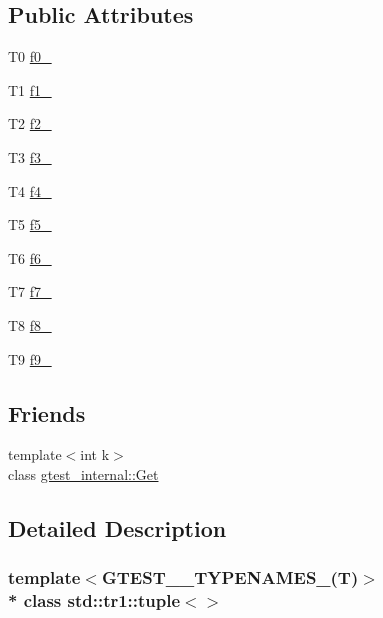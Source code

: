 \subsection*{Public Attributes}
\begin{DoxyCompactItemize}
\item 
T0 \hyperlink{classstd_1_1tr1_1_1tuple_a771b1d99e8800fb284acd04bca838cbb}{f0\+\_\+}
\item 
T1 \hyperlink{classstd_1_1tr1_1_1tuple_a7cccf899dedc626c51fa4f6921d0ac52}{f1\+\_\+}
\item 
T2 \hyperlink{classstd_1_1tr1_1_1tuple_aaec06c27366502dc332ef96878628f84}{f2\+\_\+}
\item 
T3 \hyperlink{classstd_1_1tr1_1_1tuple_ad4d3673e0d5c07c392c02e335fe978ff}{f3\+\_\+}
\item 
T4 \hyperlink{classstd_1_1tr1_1_1tuple_ab662f1051c2302d065796383848db6c4}{f4\+\_\+}
\item 
T5 \hyperlink{classstd_1_1tr1_1_1tuple_a32d8cd6f180c0a77d83733fc65423657}{f5\+\_\+}
\item 
T6 \hyperlink{classstd_1_1tr1_1_1tuple_a597beab3af3f95c84408491ab14632b0}{f6\+\_\+}
\item 
T7 \hyperlink{classstd_1_1tr1_1_1tuple_a7c28780e616d382833e844f62672c6bc}{f7\+\_\+}
\item 
T8 \hyperlink{classstd_1_1tr1_1_1tuple_ae859012c83943e54e035a4a32089ccb6}{f8\+\_\+}
\item 
T9 \hyperlink{classstd_1_1tr1_1_1tuple_a336d5e582fd34e45ec88c78d473671dd}{f9\+\_\+}
\end{DoxyCompactItemize}
\subsection*{Friends}
\begin{DoxyCompactItemize}
\item 
{\footnotesize template$<$int k$>$ }\\class \hyperlink{classstd_1_1tr1_1_1tuple_aeeed38755abdaa78587dd1eac9ccc950}{gtest\+\_\+internal\+::\+Get}
\end{DoxyCompactItemize}


\subsection{Detailed Description}
\subsubsection*{template$<$G\+T\+E\+S\+T\+\_\+\_\+\+T\+Y\+P\+E\+N\+A\+M\+E\+S\+\_\+(\+T)$>$\\*
class std\+::tr1\+::tuple$<$$>$}



